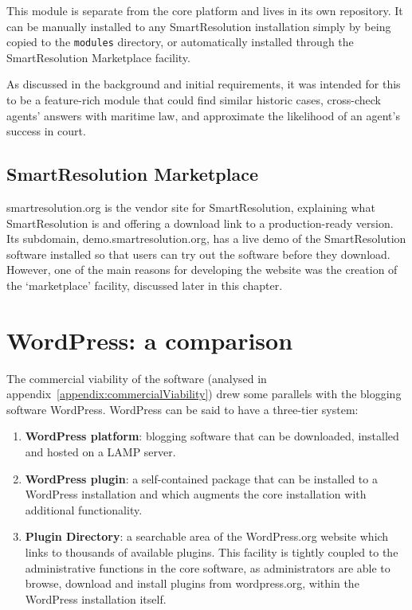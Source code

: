 This module is separate from the core platform and lives in its own repository. It can be manually installed to any SmartResolution installation simply by being copied to the \lstinline{modules} directory, or automatically installed through the SmartResolution Marketplace facility.

As discussed in the background and initial requirements, it was intended for this to be a feature-rich module that could find similar historic cases, cross-check agents' answers with maritime law, and approximate the likelihood of an agent's success in court.

\subsection{SmartResolution Marketplace}

smartresolution.org is the vendor site for SmartResolution, explaining what SmartResolution is and offering a download link to a production-ready version. Its subdomain, demo.smartresolution.org, has a live demo of the SmartResolution software installed so that users can try out the software before they download. However, one of the main reasons for developing the website was the creation of the `marketplace' facility, discussed later in this chapter.

\section{WordPress: a comparison}

The commercial viability of the software (analysed in appendix~\ref{appendix:commercialViability}) drew some parallels with the blogging software WordPress. WordPress can be said to have a three-tier system:

\begin{enumerate}
    \item \textbf{WordPress platform}: blogging software that can be downloaded, installed and hosted on a LAMP server.

    \item \textbf{WordPress plugin}: a self-contained package that can be installed to a WordPress installation and which augments the core installation with additional functionality.

    \item \textbf{Plugin Directory}: a searchable area of the WordPress.org website which links to thousands of available plugins. This facility is tightly coupled to the administrative functions in the core software, as administrators are able to browse, download and install plugins from wordpress.org, within the WordPress installation itself.
\end{enumerate}

